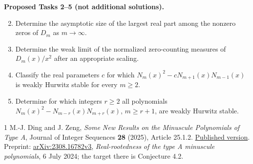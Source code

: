 \documentclass[11pt]{article}
\begin{document}
\medskip
\noindent\textbf{Proposed Tasks 2--5 (not additional solutions).}
\begin{enumerate}
\setcounter{enumi}{1}
\item Determine the asymptotic size of the largest real part among the
nonzero zeros of $D_m$ as $m\to\infty$.
\item Determine the weak limit of the normalized zero-counting measures
of $D_m(x)/x^2$ after an appropriate scaling.
\item Classify the real parameters $c$ for which
$N_m(x)^2-cN_{m+1}(x)N_{m-1}(x)$ is weakly Hurwitz stable for every $m\ge2$.
\item Determine for which integers $r\ge2$ all polynomials
$N_m(x)^2-N_{m-r}(x)N_{m+r}(x)$, $m\ge r+1$, are weakly Hurwitz stable.
\end{enumerate}

\begin{thebibliography}{1}
 M.-J. Ding and J. Zeng,
\emph{Some New Results on the Minuscule Polynomials of Type A},
Journal of Integer Sequences \textbf{28} (2025), Article 25.1.2.
\href{https://cs.uwaterloo.ca/journals/JIS/VOL28/Zeng/zeng26.pdf}{Published version}.
Preprint: \href{https://arxiv.org/abs/2308.16782}{arXiv:2308.16782v3},
\emph{Real-rootedness of the type A minuscule polynomials}, 6 July 2024;
the target there is Conjecture 4.2.
\end{thebibliography}
\end{document}
